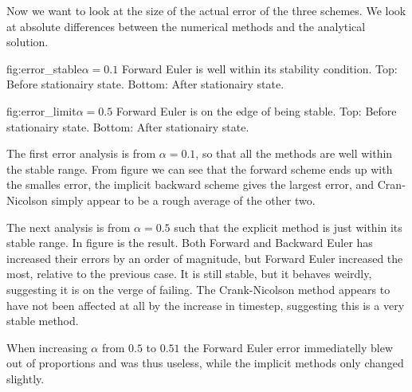 Now we want to look at the size of the actual error of the three schemes. We 
look at absolute differences between the numerical methods and the analytical 
solution.

{fig:error_stable}{$\alpha=0.1$ Forward Euler is well within its stability 
condition. Top: Before stationairy state. Bottom: After stationairy state.}

{fig:error_limit}{$\alpha=0.5$ Forward Euler is on the edge of being stable. 
Top: Before stationairy state. Bottom: After stationairy state.}

The first error analysis is from $\alpha = 0.1$, so that all the methods are 
well within the stable range. From figure  we can see that 
the forward scheme ends up with the smalles error, the implicit backward scheme 
gives the largest error, and Cran-Nicolson simply appear to be a rough average 
of the other two.

The next analysis is from $\alpha = 0.5$ such that the explicit method is just 
within its stable range. In figure  is the result. Both 
Forward and Backward Euler has increased their errors by an order of magnitude, 
but Forward Euler increased the most, relative to the previous case. It is 
still stable, but it behaves weirdly, suggesting it is on the verge of failing. 
The Crank-Nicolson method appears to have not been affected at all by the 
increase in timestep, suggesting this is a very stable method.

When increasing $\alpha$ from $0.5$ to $0.51$ the Forward Euler error 
immediatelly blew out of proportions and was thus useless, while the implicit 
methods only changed slightly.